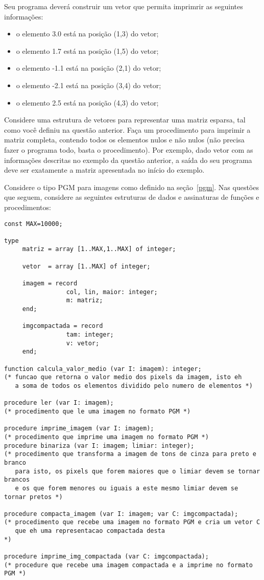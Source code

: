 Seu programa deverá construir um 
vetor que permita imprimrir as seguintes informações:

\begin{itemize}
\item o elemento 3.0 está na posição (1,3) do vetor;
\item o elemento 1.7 está na posição (1,5) do vetor;
\item o elemento -1.1 está na posição (2,1) do vetor;
\item o elemento -2.1 está na posição (3,4) do vetor;
\item o elemento 2.5 está na posição (4,3) do vetor;
\end{itemize}

\item Considere uma estrutura de vetores para representar uma matriz 
esparsa, tal como você definiu na questão anterior. Faça
um procedimento para imprimir a matriz completa, contendo todos
os elementos nulos e não nulos 
(não precisa fazer o programa todo, basta o procedimento).
Por exemplo, dado vetor com as informações descritas no 
exemplo da questão anterior, a saída do seu programa deve
ser exatamente a matriz apresentada no início do exemplo.

\item Considere o tipo PGM para imagens como definido na seção~\ref{pgm}.
Nas questões que seguem, considere as seguintes estruturas de dados e 
assinaturas de funções e procedimentos:

\begin{lstlisting}
const MAX=10000;

type
     matriz = array [1..MAX,1..MAX] of integer;

     vetor  = array [1..MAX] of integer;

     imagem = record
                 col, lin, maior: integer;
                 m: matriz;
     end;

     imgcompactada = record
                 tam: integer;
                 v: vetor;
     end;
  
function calcula_valor_medio (var I: imagem): integer;
(* funcao que retorna o valor medio dos pixels da imagem, isto eh
   a soma de todos os elementos dividido pelo numero de elementos *)

procedure ler (var I: imagem);
(* procedimento que le uma imagem no formato PGM *)

procedure imprime_imagem (var I: imagem);
(* procedimento que imprime uma imagem no formato PGM *)
procedure binariza (var I: imagem; limiar: integer);
(* procedimento que transforma a imagem de tons de cinza para preto e branco
   para isto, os pixels que forem maiores que o limiar devem se tornar brancos
   e os que forem menores ou iguais a este mesmo limiar devem se tornar pretos *)

procedure compacta_imagem (var I: imagem; var C: imgcompactada);
(* procedimento que recebe uma imagem no formato PGM e cria um vetor C
   que eh uma representacao compactada desta                           *)

procedure imprime_img_compactada (var C: imgcompactada);
(* procedure que recebe uma imagem compactada e a imprime no formato PGM *)
\end{lstlisting}


